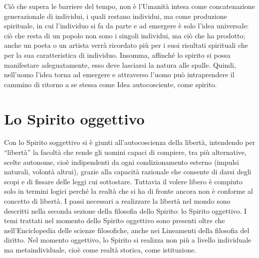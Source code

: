 \documentclass[a4paper,12pt,oneside,openany]{book}%
\begin{document}
	Ciò che supera le barriere del tempo, non è l’Umanità intesa come concatenazione generazionale di individui, i quali restano individui, ma come produzione spirituale, in cui l’individuo si fa da parte e ad emergere è solo l’idea universale: ciò che resta di un popolo non sono i singoli individui, ma ciò che ha prodotto; anche un poeta o un artista verrà ricordato più per i suoi risultati spirituali che per la sua caratteristica di individuo. Insomma, affinché lo spirito si possa manifestare adeguatamente, esso deve lasciarsi la natura alle spalle. Quindi, nell’uomo l’idea torna ad emergere e attraverso l’uomo può intraprendere il cammino di ritorno a se stessa come Idea autocosciente, come spirito.
\newpage	
	
\section*{Lo Spirito oggettivo}	
	
Con lo Spirito soggettivo si è giunti all’autocoscienza della libertà, intendendo per “libertà” la facoltà che rende gli uomini capaci di compiere, tra più alternative, scelte autonome, cioè indipendenti da ogni condizionamento esterno (impulsi naturali, volontà altrui), grazie alla capacità razionale che consente di darsi degli scopi e di fissare delle leggi cui sottostare. Tuttavia il volere libero è compiuto solo in termini logici perché la realtà che si ha di fronte ancora non è conforme al concetto di libertà. I passi necessari a realizzare la libertà nel mondo sono descritti nella seconda sezione della filosofia dello Spirito: lo Spirito oggettivo. I temi trattati nel momento dello Spirito oggettivo sono presenti oltre che nell’Enciclopedia delle scienze filosofiche, anche nei Lineamenti della filosofia del diritto. Nel momento oggettivo, lo Spirito si realizza non più a livello individuale ma metaindividuale, cioè come realtà storica, come istituzione.
\end{document}
